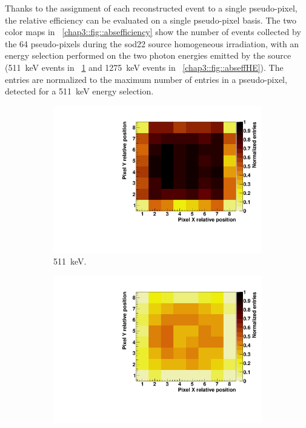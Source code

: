 Thanks to the assignment of each reconstructed event to a single pseudo-pixel, the relative efficiency can be evaluated on a single pseudo-pixel basis. The two color maps in \figurename~\ref{chap3::fig::absefficiency} show the number of events collected by the 64 pseudo-pixels during the \gls{sod22} source homogeneous irradiation, with an energy selection performed on the two photon energies emitted by the source (511~keV events in \figurename~\ref{chap3::fig::abseffLE} and 1275~keV events in \figurename~\ref{chap3::fig::abseffHE}). The entries are normalized to the maximum number of entries in a pseudo-pixel, detected for a 511~keV energy selection.

\begin{figure}
\begin{subfigure}[t]{0.5\textwidth}
\centering
\includegraphics[width=1\textwidth]{03_GraphicFiles/chapter3_CLaRySproto/Absorber/images/eff_map_LE_norm.pdf}
\caption{511~keV.}
\label{chap3::fig::abseffLE}
\end{subfigure}
\begin{subfigure}[t]{0.5\textwidth}
\centering
\includegraphics[width=1\textwidth]{03_GraphicFiles/chapter3_CLaRySproto/Absorber/images/eff_map_HE_norm.pdf}

\end{subfigure}
\end{figure}
